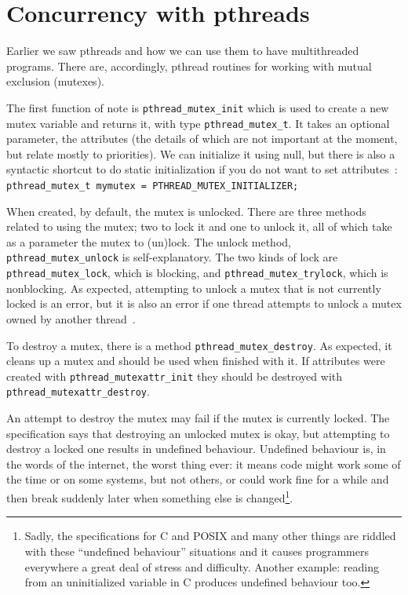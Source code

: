 




\section*{Concurrency with pthreads}

Earlier we saw pthreads and how we can use them to have multithreaded programs. There are, accordingly, pthread routines for working with mutual exclusion (mutexes).

The first function of note is \texttt{pthread\_mutex\_init} which is used to create a new mutex variable and returns it, with type \texttt{pthread\_mutex\_t}. It takes an optional parameter, the attributes (the details of which are not important at the moment, but relate mostly to priorities). We can initialize it using null, but there is also a syntactic shortcut to do static initialization if you do not want to set attributes~\cite{pthreads}: \\ \texttt{pthread\_mutex\_t mymutex = PTHREAD\_MUTEX\_INITIALIZER;} 

When created, by default, the mutex is unlocked. There are three methods related to using the mutex; two to lock it and one to unlock it, all of which take as a parameter the mutex to (un)lock. The unlock method, \texttt{pthread\_mutex\_unlock} is self-explanatory. The two kinds of lock are \texttt{pthread\_mutex\_lock}, which is blocking, and \texttt{pthread\_mutex\_trylock}, which is nonblocking. As expected, attempting to unlock a mutex that is not currently locked is an error, but it is also an error if one thread attempts to unlock a mutex owned by another thread~\cite{pthreads}.

To destroy a mutex, there is a method \texttt{pthread\_mutex\_destroy}. As expected, it cleans up a mutex and should be used when finished with it. If attributes were created with \texttt{pthread\_mutexattr\_init} they should be destroyed with \texttt{pthread\_mutexattr\_destroy}.

An attempt to destroy the mutex may fail if the mutex is currently locked. The specification says that destroying an unlocked mutex is okay, but attempting to destroy a locked one results in undefined behaviour. Undefined behaviour is, in the words of the internet, the worst thing ever: it means code might work some of the time or on some systems, but not others, or could work fine for a while and then break suddenly later when something else is changed\footnote{Sadly, the specifications for C and POSIX and many other things are riddled with these ``undefined behaviour'' situations and it causes programmers everywhere a great deal of stress and difficulty. Another example: reading from an uninitialized variable in C produces undefined behaviour too.}.

